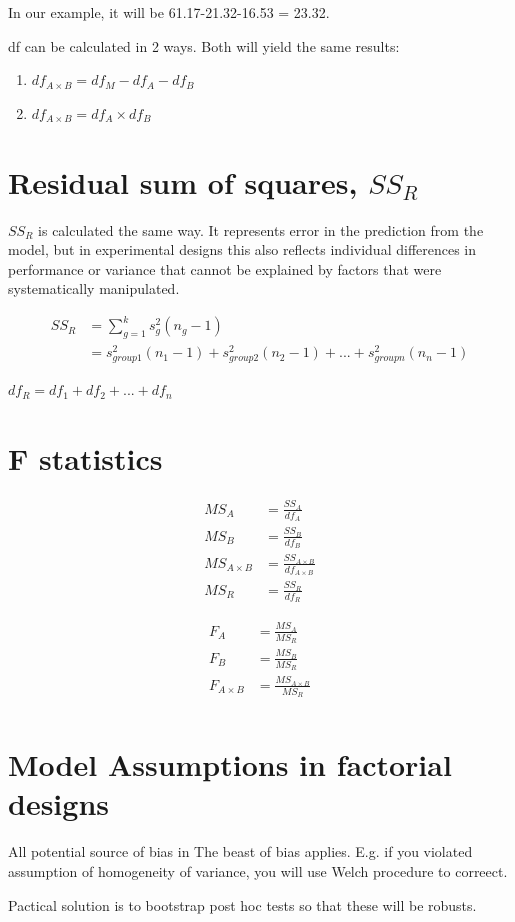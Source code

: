 In our example, it will be 61.17-21.32-16.53 = 23.32.

df can be calculated in 2 ways. Both will yield the same results:
\begin{enumerate}
\item $df_{A \times B} = df_M - df_A - df_B$
\item $df_{A \times B} = df_A \times df_B$
\end{enumerate}

\section{Residual sum of squares, $SS_R$}
$SS_R$ is calculated the same way. It represents error in the prediction from the model, but in experimental designs this also reflects individual differences in performance or variance that cannot be explained by factors that were systematically manipulated.

\begin{equation}
\begin{split}
SS_R & = \sum^k_{g=1} s^2_g (n_g - 1) \\
& = s^2_{group1}(n_1-1) + s^2_{group2}(n_2-1) + ... + s^2_{groupn}(n_n-1)
\end{split}
\end{equation}

$df_R = df_1 + df_2 + ... + df_n$

\section{F statistics}
\begin{equation}
\begin{split}
MS_A &= \frac{SS_A}{df_A}\\
MS_B &= \frac{SS_B}{df_B}\\
MS_{A \times B} &= \frac{SS_{A \times B}}{df_{A \times B}}\\
MS_R &= \frac{SS_R}{df_R}
\end{split}
\end{equation}

\begin{equation}
\begin{split}
F_A &= \frac{MS_A}{MS_R}\\
F_B &= \frac{MS_B}{MS_R}\\
F_{A \times B} &= \frac{MS_{A \times B}}{MS_R}\\
\end{split}
\end{equation}


\section{Model Assumptions in factorial designs}

All potential source of bias in The beast of bias applies. E.g. if you violated assumption of homogeneity of variance, you will use Welch procedure to correect. 

Pactical solution is to bootstrap post hoc tests so that these will be robusts.
